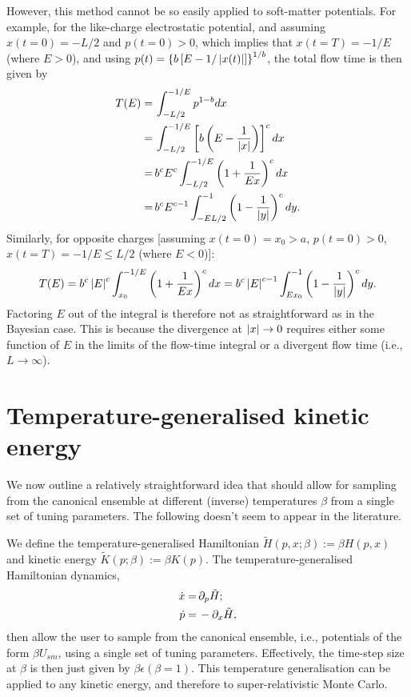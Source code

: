 \documentclass[a4paper]{article}
\begin{document}
However, this method cannot be so easily applied to soft-matter potentials. For example, for the like-charge electrostatic potential, and assuming $x(t=0) = -L / 2$ and $p(t = 0) > 0$, which implies that $x(t = T) = - 1 / E$ (where $E > 0$), and using $p(t) = \left\{ b\left[ E - 1 / \left| x(t) \right| \right] \right\}^{1 / b}$, the total flow time is then given by 
\begin{align}
T(E) =& \, \int_{- L / 2}^{- 1 / E} p^{1 - b} dx \nonumber\\
=& \, \int_{- L / 2}^{- 1 / E} \left[ b\left( E - \frac{1}{\left| x \right|} \right) \right]^{c} dx \nonumber\\
=& \, b^{c} E^{c} \int_{- L / 2}^{- 1 / E} \left( 1 + \frac{1}{E x} \right)^{c} dx \nonumber\\
=& \, b^{c} E^{c - 1} \int_{- E L / 2}^{-1} \left( 1 - \frac{1}{\left| y \right|} \right)^{c} dy \label{eq:PeriodLengthLikeCharges} .
\end{align}
Similarly, for opposite charges [assuming $x(t=0) = x_0 > a$, $p(t = 0) > 0$, $x(t = T) = - 1 / E \le L / 2$ (where $E < 0$)]: 
\begin{align}
T(E) = b^{c} \left| E \right|^c \int_{x_0}^{-1 / E} \left( 1 + \frac{1}{E x} \right)^{c} dx = b^{c} \left| E \right|^{c - 1} \int_{E x_0}^{-1} \left( 1 - \frac{1}{\left| y \right|} \right)^{c} dy \label{eq:PeriodLengthOppositeCharges} .
\end{align}
Factoring $E$ out of the integral is therefore not as straightforward as in the Bayesian case. This is because the divergence at $\left| x \right| \to 0$ requires either some function of $E$ in the limits of the flow-time integral or a divergent flow time (i.e., $L \to \infty$). 


\section{Temperature-generalised kinetic energy}

We now outline a relatively straightforward idea that should allow for sampling from the canonical ensemble at different (inverse) temperatures $\beta$ from a single set of tuning parameters. The following doesn't seem to appear in the literature. 

We define the temperature-generalised Hamiltonian $\tilde{H}(p, x; \beta) := \beta H(p, x)$ and kinetic energy $\tilde{K}(p; \beta) := \beta K(p)$. The temperature-generalised Hamiltonian dynamics, 
\begin{align} \label{eq:TempGenHamiltonianDynamics}
\dot{x} =& \, \partial_p \tilde{H}  ; \\
\dot{p} =& \, - \partial_x \tilde{H}  ,
\end{align}
then allow the user to sample from the canonical ensemble, i.e., potentials of the form $\beta U_{sm}$, using a single set of tuning parameters. Effectively, the time-step size at $\beta$ is then just given by $\beta \epsilon (\beta = 1)$. This temperature generalisation can be applied to any kinetic energy, and therefore to super-relativistic Monte Carlo.
\end{document}
